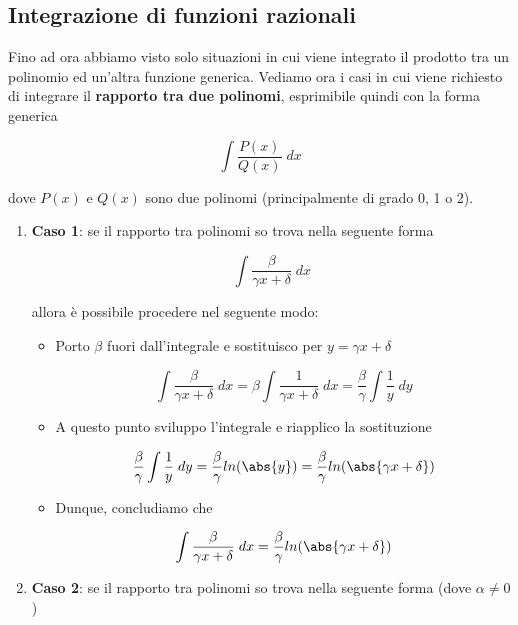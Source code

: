 \documentclass[a4paper, 12pt]{report}
\begin{document}
    \subsection{Integrazione di funzioni razionali}
    
    Fino ad ora abbiamo visto solo situazioni in cui viene integrato il prodotto tra un polinomio ed un'altra funzione generica. Vediamo ora i casi in cui viene richiesto di integrare il \textbf{rapporto tra due polinomi}, esprimibile quindi con la forma generica
    
    \[ \int \frac{P(x)}{Q(x)} \; dx \]
    
    dove $P(x)$ e $Q(x)$ sono due polinomi (principalmente di grado 0, 1 o 2).
    
        \begin{enumerate}
            \item \textbf{Caso 1}: se il rapporto tra polinomi so trova nella seguente forma
            
            \[ \int \frac{\beta}{\gamma x + \delta} \; dx\]
            
            allora è possibile procedere nel seguente modo:
            
            \begin{itemize}
                \item Porto $\beta$ fuori dall'integrale e sostituisco per $y = \gamma x + \delta$
                
            \[ \int \frac{\beta}{\gamma x + \delta} \; dx = \beta \int \frac{1}{\gamma x + \delta} \; dx = \frac{\beta}{\gamma} \int \frac{1}{y} \; dy\]
            
            \item A questo punto sviluppo l'integrale e riapplico la sostituzione
            
            \[\frac{\beta}{\gamma} \int \frac{1}{y} \; dy = \frac{\beta}{\gamma} ln(\abs{y}) = \frac{\beta}{\gamma} ln(\abs{\gamma x + \delta}) \]
            
            \item Dunque, concludiamo che
            
            \[ \int \frac{\beta}{\gamma x + \delta} \; dx =  \frac{\beta}{\gamma} ln(\abs{\gamma x + \delta}) \]
            \end{itemize}
            
            \item \textbf{Caso 2}: se il rapporto tra polinomi so trova nella seguente forma (dove $\alpha \neq 0$)
            

\end{enumerate}
\end{document}
